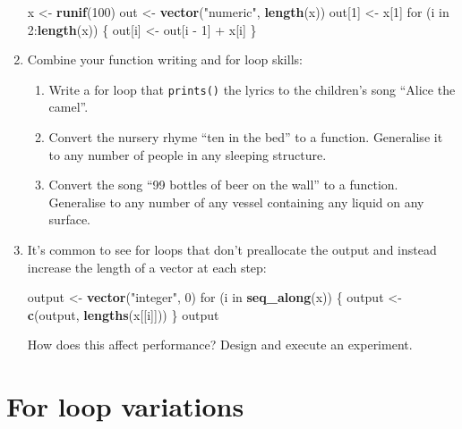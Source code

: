\documentclass[]{book}
\newenvironment{Shaded}{\begin{snugshade}}{\end{snugshade}}
\newcommand{\KeywordTok}[1]{\textcolor[rgb]{0.13,0.29,0.53}{\textbf{{#1}}}}
\newcommand{\DecValTok}[1]{\textcolor[rgb]{0.00,0.00,0.81}{{#1}}}
\newcommand{\StringTok}[1]{\textcolor[rgb]{0.31,0.60,0.02}{{#1}}}
\newcommand{\NormalTok}[1]{{#1}}
\begin{document}
\begin{enumerate}
\begin{Shaded}
\begin{Highlighting}[]
\NormalTok{x <-}\StringTok{ }\KeywordTok{runif}\NormalTok{(}\DecValTok{100}\NormalTok{)}
\NormalTok{out <-}\StringTok{ }\KeywordTok{vector}\NormalTok{(}\StringTok{"numeric"}\NormalTok{, }\KeywordTok{length}\NormalTok{(x))}
\NormalTok{out[}\DecValTok{1}\NormalTok{] <-}\StringTok{ }\NormalTok{x[}\DecValTok{1}\NormalTok{]}
\NormalTok{for (i in }\DecValTok{2}\NormalTok{:}\KeywordTok{length}\NormalTok{(x)) \{}
  \NormalTok{out[i] <-}\StringTok{ }\NormalTok{out[i -}\StringTok{ }\DecValTok{1}\NormalTok{] +}\StringTok{ }\NormalTok{x[i]}
\NormalTok{\}}
\end{Highlighting}
\end{Shaded}
\item
  Combine your function writing and for loop skills:

  \begin{enumerate}
  \def\labelenumii{\arabic{enumii}.}
  \item
    Write a for loop that \texttt{prints()} the lyrics to the children's
    song ``Alice the camel''.
  \item
    Convert the nursery rhyme ``ten in the bed'' to a function.
    Generalise it to any number of people in any sleeping structure.
  \item
    Convert the song ``99 bottles of beer on the wall'' to a function.
    Generalise to any number of any vessel containing any liquid on any
    surface.
  \end{enumerate}
\item
  It's common to see for loops that don't preallocate the output and
  instead increase the length of a vector at each step:

\begin{Shaded}
\begin{Highlighting}[]
\NormalTok{output <-}\StringTok{ }\KeywordTok{vector}\NormalTok{(}\StringTok{"integer"}\NormalTok{, }\DecValTok{0}\NormalTok{)}
\NormalTok{for (i in }\KeywordTok{seq_along}\NormalTok{(x)) \{}
  \NormalTok{output <-}\StringTok{ }\KeywordTok{c}\NormalTok{(output, }\KeywordTok{lengths}\NormalTok{(x[[i]]))}
\NormalTok{\}}
\NormalTok{output}
\end{Highlighting}
\end{Shaded}

  How does this affect performance? Design and execute an experiment.
\end{enumerate}

\section{For loop variations}\label{for-loop-variations}
\end{document}
